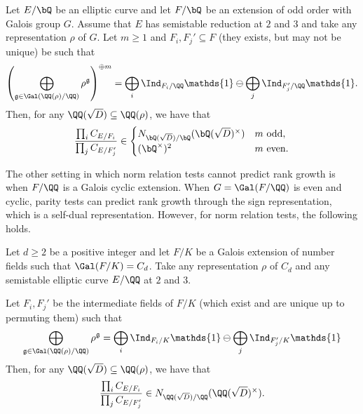 \begin{thm}\label{thm_odd-cons}
    Let $E / \bQ$ be an elliptic curve and let $F / \bQ$ be an extension of odd order with Galois group $G$. Assume that $E$ has semistable reduction at $2$ and $3$ and take any representation $\rho$ of $G$. Let $m\geq 1$ and $F_i,F_j'\subseteq F$ (they exists, but may not be unique) be such that 
    \begin{equation*}%
        \left(\bigoplus_{\mathfrak{g}\in\Gal(\QQ(\rho)/\QQ)}\rho^{\mathfrak{g}}\right)^{\oplus m }=\bigoplus_i\Ind_{F_i/\QQ}\mathds{1}\ominus\bigoplus_j\Ind_{F'_j/\QQ}\mathds{1}.
    \end{equation*}
    Then, for any $\QQ(\sqrt{D})\subseteq\QQ(\rho)$, we have that
    \[ \frac{\prod_i C_{E/F_i}}{\prod_j C_{E/F_j'}}  \in 
       \begin{cases}
           N_{\bQ(\sqrt{D}) / \bQ}(\bQ(\sqrt{D})^{\times}) & m \ \text{odd}, \\
           (\bQ^{\times})^2 & m \ \text{even}.
       \end{cases} 
    \] 
\end{thm}

The other setting in which norm relation tests cannot predict rank growth is when $F/\QQ$ is a Galois cyclic extension. When $G=\Gal(F/\QQ)$ is even and cyclic, parity tests can predict rank growth through the sign representation, which is a self-dual representation. However, for norm relation tests, the following holds.

\begin{thm}\label{thm_cyclic-cons}
    Let $d\geq2$ be a positive integer and let $F/K$ be a Galois extension of number fields such that $\Gal(F/K)=C_d$. Take any representation $\rho$ of $C_d$ and any semistable elliptic curve $E/\QQ$ at $2$ and $3$. 
    
    Let $F_i,F_j'$ be the intermediate fields of $F/K$ (which exist and are unique up to permuting them) such that 
    \begin{equation*}%
        \bigoplus_{\mathfrak{g}\in\Gal(\QQ(\rho)/\QQ)}\rho^{\mathfrak{g}}=\bigoplus_i\Ind_{F_i/K}\mathds{1}\ominus\bigoplus_j\Ind_{F'_j/K}\mathds{1}
    \end{equation*}
    Then, for any $\QQ(\sqrt{D})\subseteq\QQ(\rho)$, we have that
    $$\frac{\prod_i C_{E/F_i}}{\prod_j C_{E/F_j'}}\in N_{\QQ(\sqrt{D})/\QQ}(\QQ(\sqrt{D})^{\times}).$$
\end{thm}

